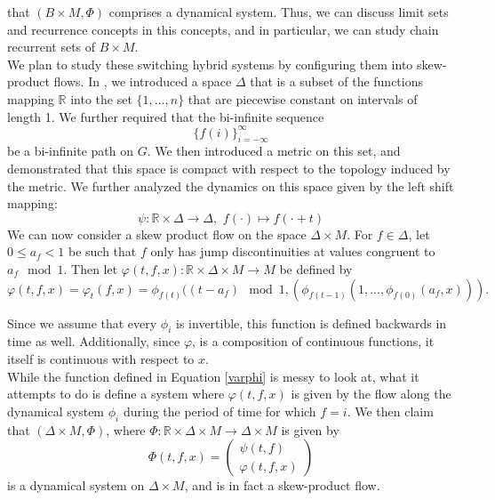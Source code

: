 \documentclass[11pt]{article}
\begin{document}
that $(B\times M, \Phi)$ comprises a dynamical system.  Thus, we can discuss limit sets and recurrence concepts in this concepts, and in particular, we can study chain recurrent sets of $B\times M$. \\
\indent We plan to study these switching hybrid systems by configuring them into skew-product flows.  In \cite{Ayers2013}, we introduced a space $\Delta$ that is a subset of the functions mapping $\mathbb{R}$ into the set $\{1,\ldots,n\}$ that are piecewise constant on intervals of length 1. We further required that the bi-infinite sequence $$\{f(i)\}_{i=-\infty}^\infty$$ be a bi-infinite path on $G$.  We then introduced a metric on this set, and demonstrated that this space is compact with respect to the topology induced by the metric.  We further analyzed the dynamics on this space given by the left shift mapping:
$$\psi:\mathbb{R}\times\Delta\rightarrow\Delta,\,\, f(\cdot)\mapsto f(\cdot+ t)$$
We can now consider a skew product flow on the space $\Delta\times M$.  For $f \in \Delta$, let $0\leq a_f<1$ be such that $f$ only has jump discontinuities at values congruent to $a_f\mod 1$.  Then let $\varphi(t,f,x):\mathbb{R} \times \Delta\times M \rightarrow M$ be defined by
\begin{equation}\label{varphi}
\varphi (t,f,x) = \varphi_t(f,x)= \phi_{f(t)}((t-a_f)\mod1,(\phi_{f(t-1)}(1,...,\phi_{f(0)}(a_f,x))). 
\end{equation}


Since we assume that every $\phi_i$ is invertible, this function is defined backwards in time as well. Additionally, since $\varphi$, is a composition of continuous functions, it itself is continuous with respect to $x$. \\
\indent While the function defined in Equation \ref{varphi} is messy to look at, what it attempts to do is define a system where $\varphi(t,f,x)$ is given by the flow along the dynamical system $\phi_i$ during the period of time for which $f = i$.  We then claim that $(\Delta\times M, \Phi)$, where $\Phi:\mathbb{R}\times\Delta\times M\rightarrow \Delta\times M$ is given by
\begin{equation*}\label{dynsys}
\Phi(t,f,x) = \left (
\begin{array}{cc}
\psi(t,f)\\
\varphi(t,f,x)
\end{array} \right ) 
\end{equation*}
is a dynamical system on $\Delta\times M$, and is in fact a skew-product flow.
\end{document}
